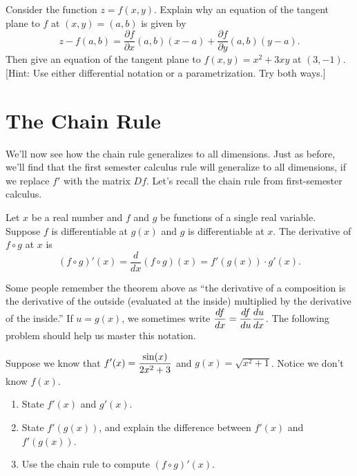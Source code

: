 \begin{problem}
 Consider the function $z=f(x,y)$. Explain why an equation of the tangent plane to $f$ at $(x,y)=(a,b)$ is given by  
$$z-f(a,b) = \frac{\partial f}{\partial x}(a,b) (x-a) +  \frac{\partial f}{\partial y}(a,b) (y-a).$$
Then give an equation of the tangent plane to $f(x,y) = x^2+3xy$ at $(3,-1)$. 
[Hint: Use either differential notation or a parametrization. Try both ways.]
\end{problem}




\section{The Chain Rule}

We'll now see how the chain rule generalizes to all dimensions.  Just as before, we'll find that the first semester calculus rule will generalize to all dimensions, if we replace $f'$ with the matrix $Df$. 
Let's recall the chain rule from first-semester calculus. 

\begin{theorem}
 Let $x$ be a real number and $f$ and $g$ be functions of a single real variable. Suppose $f$ is differentiable at $g(x)$ and $g$ is differentiable at $x$. The derivative of $f\circ g$ at $x$ is 
$$(f\circ g)'(x) = \frac{d}{dx}(f\circ g)(x) = f'(g(x))\cdot g'(x).$$
\end{theorem}

Some people remember the theorem above as ``the derivative of a composition is the derivative of the outside (evaluated at the inside) multiplied by the derivative of the inside.'' If $u=g(x)$, we sometimes write $\displaystyle \frac{df}{dx}=\frac{df}{du}\frac{du}{dx}$. The following problem should help us master this notation.

\begin{problem}\label{chain rule review problem}
 Suppose we know that $\displaystyle f'(x) = \frac{\sin(x)}{2x^2+3}$ and $g(x)=\sqrt{x^2+1}$. Notice we don't know $f(x)$. 
\begin{enumerate}
 \item State $f'(x)$ and $g'(x)$.
 \item State $f'(g(x))$, and explain the difference between $f'(x)$ and $f'(g(x))$. 
 \item Use the chain rule to compute $(f\circ g)'(x)$. 
\end{enumerate}
\end{problem}

